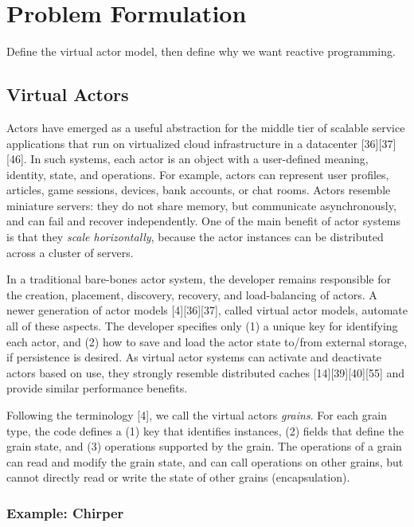 \section{Problem Formulation}

Define the virtual actor model, then define why we want reactive programming.

\subsection{Virtual Actors}

Actors have emerged as a useful abstraction for the middle tier of scalable service applications that run on virtualized cloud infrastructure in a datacenter [36][37][46]. In such systems, each actor is an object with a user-defined meaning, identity, state, and operations. For example, actors can represent user profiles, articles, game sessions, devices, bank accounts, or chat rooms. Actors resemble miniature servers: they do not share memory, but communicate asynchronously, and can fail and recover independently. One of the main benefit of actor systems is that they \emph{scale horizontally}, because the actor instances can be distributed across a cluster of servers.

In a traditional bare-bones actor system, the developer remains responsible for the creation, placement, discovery, recovery, and load-balancing of actors. A newer generation of actor models [4][36][37], called virtual actor models, automate all of these aspects. The developer specifies only (1) a unique key for identifying each actor, and (2) how to save and load the actor state to/from external storage, if persistence is desired. As virtual actor systems can activate and deactivate actors based on use, they strongly resemble distributed caches [14][39][40][55] and provide similar performance benefits. 

Following the terminology [4], we call the virtual actors \emph{grains}. For each grain type, the code defines a (1) key that identifies instances, (2)  fields that define the grain state, and (3) operations supported by the grain. The operations of a grain can read and modify the grain state, and can call operations on other grains, but cannot directly read or write the state of other grains (encapsulation). 
 
\subsubsection{Example: Chirper}

